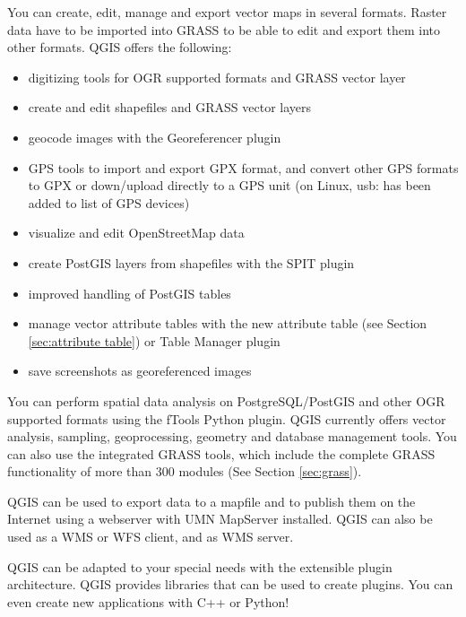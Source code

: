 
You can create, edit, manage and export vector maps in several formats. Raster data
have to be imported into GRASS to be able to edit and export them into other
formats. QGIS offers the following: 

\begin{itemize}[label=--]
\item digitizing tools for OGR supported formats and GRASS vector layer
\item create and edit shapefiles and GRASS vector layers
\item geocode images with the Georeferencer plugin
\item GPS tools to import and export GPX format, and convert other GPS
formats to GPX or down/upload directly to a GPS unit (on Linux, usb: has been added
to list of GPS devices)
\item visualize and edit OpenStreetMap data
\item create PostGIS layers from shapefiles with the SPIT plugin 
\item improved handling of PostGIS tables
\item manage vector attribute tables with the new attribute table (see Section 
\ref{sec:attribute table}) or Table Manager plugin
\item save screenshots as georeferenced images
\end{itemize}


You can perform spatial data analysis on PostgreSQL/PostGIS and other OGR
supported formats using the fTools Python plugin. QGIS currently offers
vector analysis, sampling, geoprocessing, geometry and database management
tools. You can also use the integrated GRASS tools, which 
include the complete GRASS functionality of more than 300 modules (See
Section \ref{sec:grass}).


QGIS can be used to export data to a mapfile and to publish them on the
Internet using a webserver with UMN MapServer installed. QGIS can also
be used as a WMS or WFS client, and as WMS server. 


QGIS can be adapted to your special needs with the extensible
plugin architecture. QGIS provides libraries that can be used to create
plugins.  You can even create new applications with C++ or Python!

